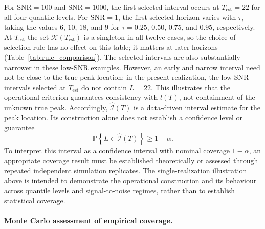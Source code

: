 \documentclass[12pt,a4paper]{article}
\begin{document}
For $\mathrm{SNR}=100$ and $\mathrm{SNR}=1000$, the first selected
interval occurs at $T_{\mathrm{est}}=22$ for all four quantile levels.
For $\mathrm{SNR}=1$, the first selected horizon varies with $\tau$,
taking the values $6$, $10$, $18$, and $9$ for
$\tau=0.25$, $0.50$, $0.75$, and $0.95$, respectively. At
$T_{\mathrm{est}}$ the set $\mathcal K(T_{\mathrm{est}})$ is a singleton
in all twelve cases, so the choice of selection rule has no effect on
this table; it matters at later horizons
(Table~\ref{tab:rule_comparison}). The selected
intervals are also substantially narrower in these low-SNR examples.
However, an early and narrow interval need not be close to the true
peak location: in the present realization, the low-SNR intervals
selected at $T_{\mathrm{est}}$ do not contain $L=22$. This illustrates
that the operational criterion guarantees consistency with
$\widehat l(T)$, not containment of the unknown true peak.
Accordingly, $\widehat{\mathcal I}(T)$ is a data-driven interval
estimate for the peak location. Its construction alone does not
establish a confidence level or guarantee
\[
\mathbb P\!\left\{
L\in\widehat{\mathcal I}(T)
\right\}
\geq 1-\alpha.
\]
To interpret this interval as a confidence interval with nominal
coverage $1-\alpha$, an appropriate coverage result must be established
theoretically or assessed through repeated independent simulation
replicates. The single-realization illustration above is intended to
demonstrate the operational construction and its behaviour across
quantile levels and signal-to-noise regimes, rather than to establish
statistical coverage.

\paragraph{Monte Carlo assessment of empirical coverage.}
\end{document}

